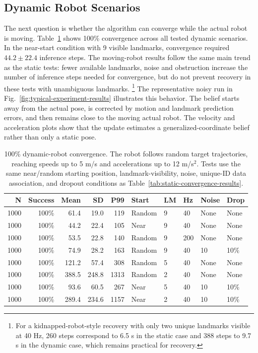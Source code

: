\FloatBarrier

\subsection{Dynamic Robot Scenarios}
\label{subsec:experiments-dynamic}

The next question is whether the algorithm can converge while the actual robot is moving. Table~\ref{tab:dynamic-convergence-results} shows 100\% convergence across all tested dynamic scenarios. In the near-start condition with 9 visible landmarks, convergence required $44.2 \pm 22.4$ inference steps. The moving-robot results follow the same main trend as the static tests: fewer available landmarks, noise and obstruction increase the number of inference steps needed for convergence, but do not prevent recovery in these tests with unambiguous landmarks.
\footnote{For a kidnapped-robot-style recovery with only two unique landmarks visible at 40 Hz, 260 steps correspond to 6.5 s in the static case and 388 steps to 9.7 s in the dynamic case, which remains practical for recovery.}
The representative noisy run in Fig.~\ref{fig:typical-experiment-results} illustrates this behavior. The belief starts away from the actual pose, is corrected by motion and landmark prediction errors, and then remains close to the moving actual robot. The velocity and acceleration plots show that the update estimates a generalized-coordinate belief rather than only a static pose.

\begin{table}[!htbp]
    \centering
    \caption{\scriptsize 100\% dynamic-robot convergence. The robot follows random target trajectories, reaching speeds up to 5 m/s and accelerations up to 12 m/s$^2$. Tests use the same near/random starting position, landmark-visibility, noise, unique-ID data association, and dropout conditions as Table~\ref{tab:static-convergence-results}.}
    \label{tab:dynamic-convergence-results}
    \scriptsize
    \begin{tabular}{rrrrrlllll}
        \toprule
        N & Success & Mean & SD & P99 & Start & LM & Hz & Noise & Drop \\
        \midrule
        1000 & 100\% & 61.4 & 19.0 & 119 & Random & 9 & 40 & None & None \\
        1000 & 100\% & 44.2 & 22.4 & 105 & Near & 9 & 40 & None & None \\
        1000 & 100\% & 53.5 & 22.8 & 140 & Random & 9 & 200 & None & None \\
        1000 & 100\% & 74.9 & 28.2 & 163 & Random & 9 & 40 & 10 & 10\% \\
        1000 & 100\% & 121.2 & 57.4 & 308 & Random & 5 & 40 & None & None \\
        1000 & 100\% & 388.5 & 248.8 & 1313 & Random & 2 & 40 & None & None \\
        1000 & 100\% & 93.6 & 60.5 & 267 & Near & 5 & 40 & 10 & 10\% \\
        1000 & 100\% & 289.4 & 234.6 & 1157 & Near & 2 & 40 & 10 & 10\% \\
        \bottomrule
    \end{tabular}
\end{table}
\FloatBarrier

